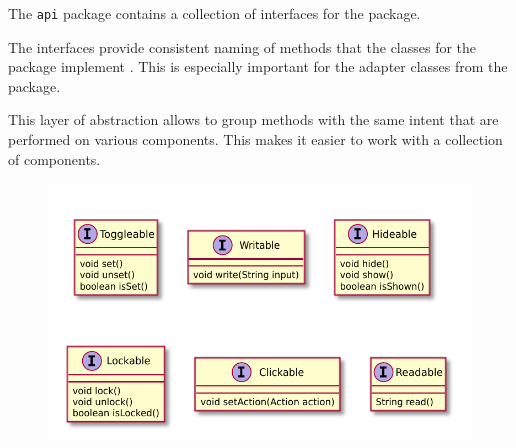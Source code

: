The \texttt{api} package contains a collection of interfaces for the \texttt{} package.

The interfaces provide consistent naming of methods that the classes for the
\texttt{} package implement . This is especially important for
the adapter classes from the \texttt{} package.

This layer of abstraction allows to group methods with the same intent that are performed on
various components. This makes it easier to work with a collection of components.

\begin{figure}[H]
	\centering
	\includegraphics[width=\textwidth]{packageDiagrams/apiPackage}
\end{figure}
